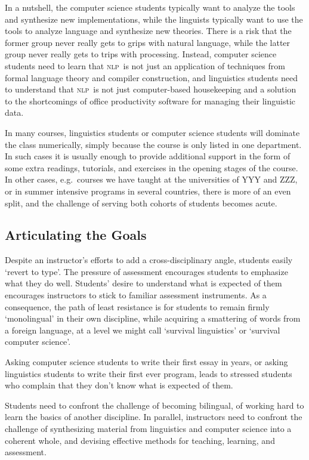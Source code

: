 \documentclass[11pt]{article}
\newcommand{\NLP}{\textsc{nlp}}
\begin{document}
In a nutshell, the computer science students typically want to analyze
the tools and synthesize new implementations, while the linguists
typically want to use the tools to analyze language and
synthesize new theories.  There is a risk that the former group
never really gets to grips with natural language, while the latter
group never really gets to trips with processing.  Instead,
computer science students need to learn that \NLP\ is not just an
application of techniques from formal language theory and compiler
construction, and linguistics students need to understand that \NLP\ is not
just computer-based housekeeping and a solution to the shortcomings of
office productivity software for managing their linguistic data.

In many courses, linguistics students or computer science students
will dominate the class numerically, simply because the course is only
listed in one department.  In such cases it is usually enough to
provide additional support in the form of some extra readings,
tutorials, and exercises in the opening stages of the course.  In
other cases, e.g.\ courses we have taught at the universities of YYY
and ZZZ, or in summer intensive programs in several countries, there
is more of an even split, and the challenge of serving both cohorts of
students becomes acute.

\subsection{Articulating the Goals}

Despite an instructor's efforts to add a cross-disciplinary angle, students
easily `revert to type'.  The pressure of assessment encourages students to emphasize
what they do well.  Students' desire to understand what is expected of them encourages
instructors to stick to familiar assessment instruments.  As a consequence,
the path of least resistance is for students to remain firmly
`monolingual' in their own discipline, while
acquiring a smattering of words from a foreign language, at a level we might
call `survival linguistics' or `survival computer science'.

Asking computer science students to write their first essay in years, or asking
linguistics students to write their first ever program, leads to
stressed students who complain that they don't know what is expected
of them.

Students need to confront the challenge of becoming bilingual, of
working hard to learn the basics of another discipline.  In parallel,
instructors need to confront the challenge of synthesizing material
from linguistics and computer science into a coherent whole, and
devising effective methods for teaching, learning, and assessment.
\end{document}
